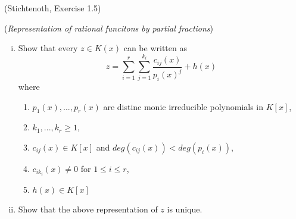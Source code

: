 \begin{exercise}(Stichtenoth, Exercise 1.5) \label{PForPartial}
    
(\textit{Representation of rational funcitons by partial fractions})
    
\begin{enumerate}[(i)]
	\item Show that every $z \in K(x)$ can be written as 
	$$z = \sum^r_{i = 1} \sum^{k_i}_{j=1} \frac{c_{ij}(x)}{p_i(x)^j} + h(x)$$ where 

	\begin{enumerate}
		\item $p_1(x),...,p_r(x)$ are distinc monic irreducible polynomials in $K[x]$,
		\item $k_1,...,k_r \geq 1$,
		\item $c_{ij}(x) \in K[x]$ and $deg(c_{ij}(x)) < deg(p_i(x))$,
		\item $c_{ik_i}(x) \neq 0$ for $1 \leq i \leq r$,
		\item $h(x) \in K[x]$
	\end{enumerate}
	\item Show that the above representation of $z$ is unique.
\end{enumerate}
\end{exercise}

